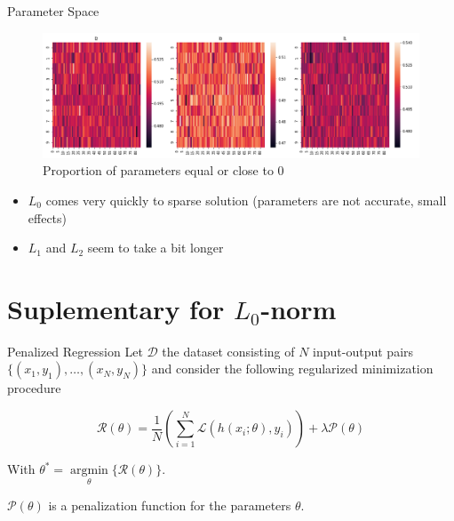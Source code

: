 \documentclass{beamer}
\DeclareMathOperator*{\argmin}{argmin}
\begin{document}
\begin{frame}[t]{Parameter Space}
  \begin{figure}[htpb]
    \centering
    \includegraphics[width=0.99\linewidth]{null_proportion.png}
    \caption{Proportion of parameters equal or close to 0}
  \end{figure}
  \begin{itemize}
    \item $L_0$ comes very quickly to sparse solution (parameters are not accurate, small effects)
    \item $L_1$ and $L_2$ seem to take a bit longer
  \end{itemize}
\end{frame}

\section{Suplementary for $L_0$-norm}
\label{sec:suplementary}

\begin{frame}[t]{Penalized Regression}
  Let $\mathcal{D}$ the dataset consisting of $N$ input-output pairs $\{(x_1, y_1), \ldots, (x_N, y_N)\}$ and consider the following regularized minimization procedure

  \begin{equation} 
    \mathcal{R}(\theta) = \frac{1}{N} ( \sum^N_{i=1} \mathcal{L}(h(x_i; \theta), y_i)) + \lambda\mathcal{P}(\theta)
  \end{equation}

  With $\theta^* = \underset{\theta}{\argmin}\{\mathcal{R}(\theta)\}$.

  $\mathcal{P}(\theta)$ is a penalization function for the parameters $\theta$.
\end{frame}
\end{document}
